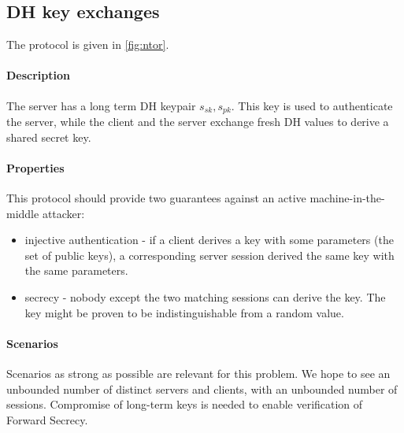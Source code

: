 \documentclass{article}
\newcommand{\sfsk}{\mathit{sk}}
\newcommand{\sfpk}{\mathit{pk}}
\begin{document}
\subsection{DH key exchanges}\label{prob:ntor}

The protocol is given in \cref{fig:ntor}.

 \paragraph{Description}The server has a long term DH keypair $s_\sfsk,s_\sfpk$.
This key is used to authenticate the server, while the client and the server exchange fresh DH values to derive a shared secret key. 

\paragraph{Properties} This protocol should provide two guarantees against an active machine-in-the-middle attacker:
\begin{itemize}
\item injective authentication - if a client derives a key with some parameters (the set of public keys), a corresponding server session derived the same key with the same parameters.
\item secrecy - nobody except the two matching sessions can derive the key.  The key might be proven to be indistinguishable from a random value.
\end{itemize}

\paragraph{Scenarios} Scenarios as strong as possible are relevant for this problem. We hope to see an unbounded number of distinct servers and clients, with an unbounded number of sessions. Compromise of long-term keys is needed to enable verification of Forward Secrecy.  
\end{document}
